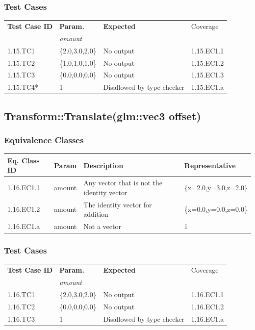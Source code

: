 \documentclass[11pt]{article}
\begin{document}
\subsubsection*{Test Cases}
\label{sec:orgc52b0e2}
\begin{center}
\begin{tabularx}{\textwidth}{lXXX}
\hline
\textbf{Test Case ID} & \textbf{Param.} & \textbf{Expected} & Coverage\\
 & \textit{amount} &  & \\
\hline
1.15.TC1 & \{2.0,3.0,2.0\} & No output & 1.15.EC1.1\\
\hline
1.15.TC2 & \{1.0,1.0,1.0\} & No output & 1.15.EC1.2\\
\hline
1.15.TC3 & \{0.0,0.0,0.0\} & No output & 1.15.EC1.3\\
\hline
1.15.TC4* & 1 & Disallowed by type checker & 1.15.EC1.a\\
\hline
\end{tabularx}
\end{center}
\subsection{Transform::Translate(glm::vec3 offset)}
\label{sec:orgf9a1e2e}

\subsubsection*{Equivalence Classes}
\label{sec:org74dbeef}
\begin{center}
\begin{tabularx}{\textwidth}{lXXX}
\hline
\textbf{Eq. Class ID} & \textbf{Param} & \textbf{Description} & \textbf{Representative}\\
\hline
1.16.EC1.1 & amount & Any vector that is not the identity vector & \{x=2.0,y=3.0,z=2.0\}\\
\hline
1.16.EC1.2 & amount & The identity vector for addition & \{x=0.0,y=0.0,z=0.0\}\\
\hline
1.16.EC1.a & amount & Not a vector & 1\\
\hline
\end{tabularx}
\end{center}
\subsubsection*{Test Cases}
\label{sec:org9947f59}
\begin{center}
\begin{tabularx}{\textwidth}{lXXX}
\hline
\textbf{Test Case ID} & \textbf{Param.} & \textbf{Expected} & Coverage\\
 & \textit{amount} &  & \\
\hline
1.16.TC1 & \{2.0,3.0,2.0\} & No output & 1.16.EC1.1\\
\hline
1.16.TC2 & \{0.0,0.0,0.0\} & No output & 1.16.EC1.2\\
\hline
1.16.TC3 & 1 & Disallowed by type checker & 1.16.EC1.a\\
\hline
\end{tabularx}
\end{center}
\end{document}
